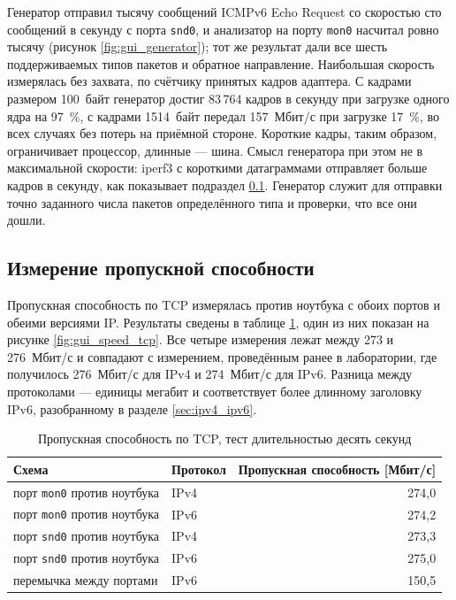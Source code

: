 Генератор отправил тысячу сообщений ICMPv6 Echo Request со скоростью сто сообщений в секунду с порта \texttt{snd0}, и анализатор на порту \texttt{mon0} насчитал ровно тысячу (рисунок \ref{fig:gui_generator}); тот же результат дали все шесть поддерживаемых типов пакетов и обратное направление. Наибольшая скорость измерялась без захвата, по счётчику принятых кадров адаптера. С кадрами размером 100~байт генератор достиг 83\,764 кадров в секунду при загрузке одного ядра на 97~\%, с кадрами 1514~байт передал 157~Мбит/с при загрузке 17~\%, во всех случаях без потерь на приёмной стороне. Короткие кадры, таким образом, ограничивает процессор, длинные — шина. Смысл генератора при этом не в максимальной скорости: iperf3 с короткими датаграммами отправляет больше кадров в секунду, как показывает подраздел \ref{sec:mereni_propustnosti}. Генератор служит для отправки точно заданного числа пакетов определённого типа и проверки, что все они дошли.

\subsection{Измерение пропускной способности}
\label{sec:mereni_propustnosti}

Пропускная способность по TCP измерялась против ноутбука с обоих портов и обеими версиями IP. Результаты сведены в таблице \ref{tab:propustnost}, один из них показан на рисунке \ref{fig:gui_speed_tcp}. Все четыре измерения лежат между 273 и 276~Мбит/с и совпадают с измерением, проведённым ранее в лаборатории, где получилось 276~Мбит/с для IPv4 и 274~Мбит/с для IPv6. Разница между протоколами — единицы мегабит и соответствует более длинному заголовку IPv6, разобранному в разделе \ref{sec:ipv4_ipv6}.

\begin{table}[htbp]
    \caption{Пропускная способность по TCP, тест длительностью десять секунд}
    \label{tab:propustnost}
    \centering
    \begin{tabular}{llr}
        \hline
        Схема & Протокол & Пропускная способность [Мбит/с] \\
        \hline
        порт \texttt{mon0} против ноутбука & IPv4 & 274,0 \\
        порт \texttt{mon0} против ноутбука & IPv6 & 274,2 \\
        порт \texttt{snd0} против ноутбука & IPv4 & 273,3 \\
        порт \texttt{snd0} против ноутбука & IPv6 & 275,0 \\
        перемычка между портами & IPv6 & 150,5 \\
        \hline
    \end{tabular}
\end{table}

